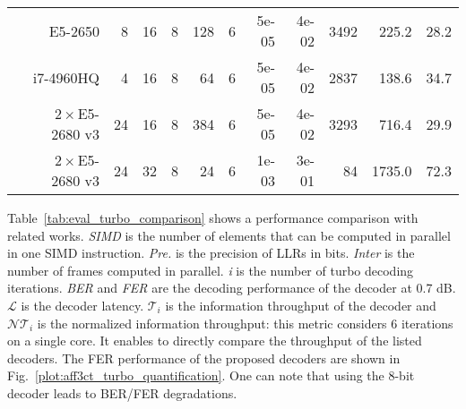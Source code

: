 \begin{table}[htp]
{{\begin{tabular}{r r r r r r r r r r r r}
  \cite{Cassagne2016a}              & E5-2650             & 8              & 16            &  8           & 128             & 6        & 5e-05        & 4e-02            &                 3492  &                 225.2  &   28.2                \\
  \cite{Cassagne2016a}              & i7-4960HQ           & 4              & 16            &  8           & 64              & 6        & 5e-05        & 4e-02            &                 2837  &                 138.6  &   34.7                \\
  \cite{Cassagne2016a}              & $2\times$E5-2680 v3 & 24             & 16            &  8           & 384             & 6        & 5e-05        & 4e-02            &                 3293  &                 716.4  &   29.9                \\
  \cite{LeGal2019a}                 & $2\times$E5-2680 v3 & 24             & 32            &  8           & 24              & 6        & 1e-03        & 3e-01            &                   84  &                1735.0  &   72.3                \\
  \end{tabular}
  }}
\end{table}

Table~\ref{tab:eval_turbo_comparison} shows a performance comparison with
related works. \emph{SIMD} is the number of elements that can be computed in
parallel in one SIMD instruction. \emph{Pre.} is the precision of LLRs in bits.
\emph{Inter} is the number of frames computed in parallel. \emph{i} is the
number of turbo decoding iterations. \emph{BER} and \emph{FER} are the decoding
performance of the decoder at 0.7 dB. $\mathcal{L}$ is the decoder latency.
$\mathcal{T}_i$ is the information throughput of the decoder and
$\mathcal{NT}_i$ is the normalized information throughput: this metric considers
6 iterations on a single core. It enables to directly compare the throughput of
the listed decoders. The FER performance of the proposed decoders are shown in
Fig.~\ref{plot:aff3ct_turbo_quantification}. One can note that using the 8-bit
decoder leads to BER/FER degradations.

